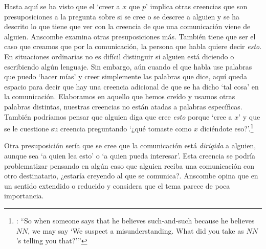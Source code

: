 Hasta aquí se ha visto que el `creer a $x$ que $p$' implica otras creencias que son presuposiciones a la pregunta sobre si se cree o se descree a alguien y se ha descrito lo que tiene que ver con la creencia de que una comunicación viene de alguien. Anscombe examina otras presuposiciones más. También tiene que ser el caso que creamos que por la comunicación, la persona que habla quiere decir \emph{esto}. En situaciones ordinarias no es difícil distinguir si alguien está diciendo o escribiendo algún lenguaje. Sin embargo, aún cuando el que habla use palabras que puedo `hacer mías' y creer simplemente las palabras que dice, aquí queda espacio para decir que hay una creencia adicional de que se ha dicho `tal cosa' en la comunicación. Elaboramos en aquello que hemos creído y usamos otras palabras distintas, nuestras creencias no están atadas a palabras específicas. También podríamos pensar que alguien diga que cree \emph{esto} porque `cree a $x$' y que se le cuestione su creencia preguntando \enquote*{¿qué tomaste como $x$ diciéndote eso?}.\footnote{\cite[Cf.~][8]{anscombe2008faith:tobelieve}: \enquote{So when someone says that he believes such-and-such because he believes $NN$, we may say `We suspect a misunderstanding. What did you take as $NN$'s telling you that?'}}

Otra presuposición sería que se cree que la comunicación está \emph{dirigida} a alguien, aunque sea \enquote*{a quien lea esto} o \enquote*{a quien pueda interesar}. Esta creencia se podría problematizar pensando en algún caso que alguien reciba una comunicación con otro destinatario, ¿estaría creyendo al que se comunica?. Anscombe opina que en un sentido extendido o reducido y considera que el tema parece de poca importancia.

